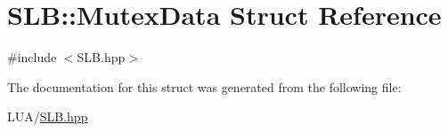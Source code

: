 \hypertarget{structSLB_1_1MutexData}{}\section{S\+LB\+:\+:Mutex\+Data Struct Reference}
\label{structSLB_1_1MutexData}


{\ttfamily \#include $<$S\+L\+B.\+hpp$>$}



The documentation for this struct was generated from the following file\+:\begin{DoxyCompactItemize}
\item 
L\+U\+A/\hyperlink{SLB_8hpp}{S\+L\+B.\+hpp}\end{DoxyCompactItemize}
